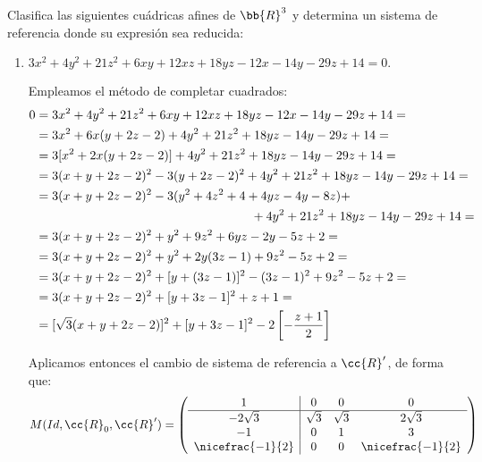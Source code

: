 \begin{ejercicio}
    Clasifica las siguientes cuádricas afines de $\bb{R}^3$ y determina un sistema de referencia donde su expresión sea reducida:
    \begin{enumerate}
        \item $3x^2 + 4y^2 + 21z^2 + 6xy + 12xz + 18yz - 12x - 14y - 29z + 14 = 0.$

        Empleamos el método de completar cuadrados:
        \begin{equation*}
            \begin{split}
                0 &= 3x^2 + 4y^2 + 21z^2 + 6xy + 12xz + 18yz - 12x - 14y - 29z + 14 =\\
                &= 3x^2+6x(y+2z-2) + 4y^2 + 21z^2 + 18yz - 14y - 29z + 14 =\\
                &= 3[x^2+2x(y+2z-2)] + 4y^2 + 21z^2 + 18yz - 14y - 29z + 14 =\\
                &= 3(x + y+2z-2)^2-3(y+2z-2)^2 + 4y^2 + 21z^2 + 18yz - 14y - 29z + 14 =\\
                &= 3(x + y+2z-2)^2-3(y^2+4z^2+4+4yz-4y-8z) +\\&\hspace{0.5\linewidth}+4y^2 + 21z^2 + 18yz - 14y - 29z + 14 =\\
                &= 3(x + y+2z-2)^2 +y^2 + 9z^2 + 6yz - 2y - 5z + 2 =\\
                &= 3(x + y+2z-2)^2 +y^2 + 2y(3z-1) + 9z^2- 5z + 2 =\\
                &= 3(x + y+2z-2)^2 + [y+(3z-1)]^2 -(3z-1)^2 + 9z^2- 5z + 2 =\\
                &= 3(x + y+2z-2)^2 + [y+3z-1]^2 +z +1 =\\
                &= [\sqrt{3}(x + y+2z-2)]^2 + [y+3z-1]^2 -2\left[-\frac{z+1}{2}\right]
            \end{split}
        \end{equation*}

        Aplicamos entonces el cambio de sistema de referencia a $\cc{R}'$, de forma que:
        \begin{equation*}
            M(Id, \cc{R}_0, \cc{R}') = \left(\begin{array}{c|ccc}
                1 & 0 & 0 & 0 \\ \hline
                -2\sqrt{3} & \sqrt{3} & \sqrt{3} & 2\sqrt{3} \\
                -1 & 0 & 1 & 3 \\
                \nicefrac{-1}{2} & 0 & 0 & \nicefrac{-1}{2}
            \end{array}\right)
        \end{equation*}


\end{enumerate}
\end{ejercicio}

